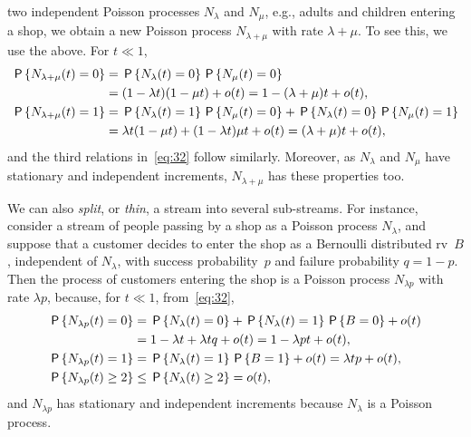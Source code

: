 \documentclass[stochastic-or.tex]{subfiles}
\begin{document}
 two independent Poisson processes $N_{\lambda}$ and $N_{\mu}$, e.g., adults and children entering a shop, we obtain a new Poisson process $N_{\lambda +\mu}$ with rate $\lambda + \mu$. To see this, we use the above. For $t\ll 1$,
\begin{align*}
\P{N_{\lambda+\mu}( t) = 0} &= \P{N_{\lambda}( t) = 0} \P{N_{\mu}( t) = 0} \\
  &= (1-\lambda t)(1-\mu t) + o(t) = 1 - (\lambda + \mu)t + o(t), \\
\P{N_{\lambda+\mu}( t) = 1} &= \P{N_{\lambda}( t) = 1} \P{N_{\mu}( t) = 0}  + \P{N_{\lambda}( t) = 0} \P{N_{\mu}( t) = 1}\\
  &= \lambda t (1-\mu t) + (1-\lambda t)\mu t + o(t) = (\lambda + \mu) t + o(t),
\end{align*}
and the third  relations in~\cref{eq:32} follow similarly.
Moreover, as $N_{\lambda}$ and $N_{\mu}$ have stationary and independent increments, $N_{\lambda +\mu}$ has these properties too.

We can also \emph{split}, or \emph{thin}, a stream into several sub-streams.
For instance, consider a stream of people passing by a shop as a Poisson process $N_\lambda$, and suppose that a customer decides to enter the shop as a Bernoulli distributed rv~$B$, independent of $N_{\lambda}$, with success probability~$p$ and failure probability $q=1-p$.
Then the process of customers entering the shop is a Poisson process $N_{\lambda p}$ with rate $\lambda p$, because, for $t\ll 1$, from~\cref{eq:32},
\begin{align*}
  \P{N_{\lambda p}(t) = 0 } &= \P{N_{\lambda}(t) = 0} +\P{N_{\lambda}(t) = 1}\P{B=0} + o(t)\\
  &= 1- \lambda t + \lambda t q  + o(t) = 1 - \lambda p t + o(t),\\
  \P{N_{\lambda p}(t) = 1 } &= \P{N_{\lambda}(t) = 1}\P{B=1} + o(t)= \lambda t p + o(t),\\
  \P{N_{\lambda p}(t) \geq 2 } &\leq  \P{N_{\lambda}(t) \geq 2} = o(t),
\end{align*}
and $N_{\lambda p}$ has stationary and independent increments because $N_{\lambda}$ is a Poisson process.
\end{document}
